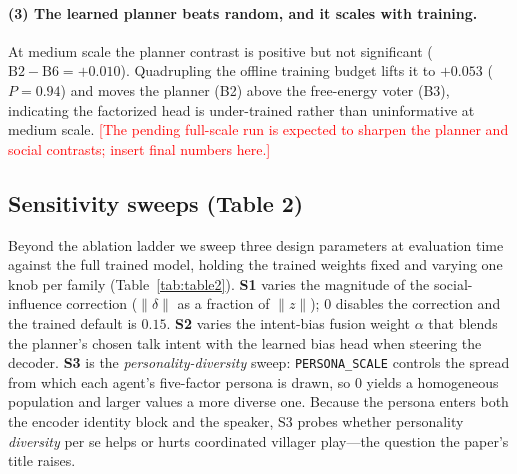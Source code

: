 \documentclass[11pt]{article}
\newcommand{\note}[1]{\textcolor{red}{[#1]}}
\begin{document}
\paragraph{(3) The learned planner beats random, and it scales with training.} At
medium scale the planner contrast is positive but not significant
($\mathrm{B2}-\mathrm{B6}=+0.010$). Quadrupling the offline training budget lifts
it to $+0.053$ ($P{=}0.94$) and moves the planner (B2) above the free-energy
voter (B3), indicating the factorized head is under-trained rather than
uninformative at medium scale. \note{The pending full-scale run is expected to
sharpen the planner and social contrasts; insert final numbers here.}

\subsection{Sensitivity sweeps (Table 2)}
\label{sec:sweeps}
Beyond the ablation ladder we sweep three design parameters at evaluation time
against the full trained model, holding the trained weights fixed and varying one
knob per family (Table~\ref{tab:table2}). \textbf{S1} varies the magnitude of the
social-influence correction ($\lVert\delta\rVert$ as a fraction of
$\lVert z\rVert$); $0$ disables the correction and the trained default is $0.15$.
\textbf{S2} varies the intent-bias fusion weight $\alpha$ that blends the planner's
chosen talk intent with the learned bias head when steering the decoder.
\textbf{S3} is the \emph{personality-diversity} sweep: \texttt{PERSONA\_SCALE}
controls the spread from which each agent's five-factor persona is drawn, so
$0$ yields a homogeneous population and larger values a more diverse one. Because
the persona enters both the encoder identity block and the speaker, S3 probes
whether personality \emph{diversity} per se helps or hurts coordinated villager
play---the question the paper's title raises.
\end{document}
